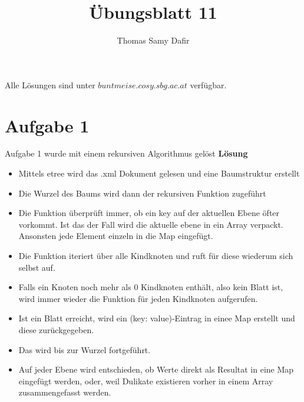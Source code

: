 \documentclass[12pt, a4paper]{report}
\title{Übungsblatt 11}
\author{Thomas Samy Dafir}
\date{}
\begin{document}
\maketitle

Alle Lösungen sind unter $buntmeise.cosy.sbg.ac.at$ verfügbar.

\section*{Aufgabe 1}
Aufgabe 1 wurde mit einem rekursiven Algorithmus gelöst
\textbf{Lösung}
	\begin{itemize}
		\item Mittels etree wird das .xml Dokument gelesen und eine Baumstruktur erstellt
		\item Die Wurzel des Baums wird dann der rekursiven Funktion zugeführt
		\item Die Funktion überprüft immer, ob ein key auf der aktuellen Ebene öfter vorkommt. Ist das der Fall
		wird die aktuelle ebene in ein Array verpackt. Ansonsten jede Element einzeln in die Map eingefügt.
		\item Die Funktion iteriert über alle Kindknoten und ruft für diese wiederum sich selbst auf.
		\item Falls ein Knoten noch mehr als 0 Kindknoten enthält, also kein Blatt ist, wird immer wieder
		die Funktion für jeden Kindknoten aufgerufen.
		\item Ist ein Blatt erreicht, wird ein (key: value)-Eintrag in einee Map erstellt und diese zurückgegeben.
		\item Das wird bis zur Wurzel fortgeführt.
		\item Auf jeder Ebene wird entschieden, ob Werte direkt als Resultat in eine Map eingefügt werden, oder, weil
		Dulikate existieren vorher in einem Array zusammengefasst werden. 
	\end{itemize}
\end{document}
